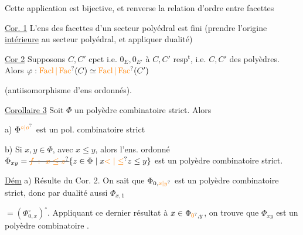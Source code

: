 Cette application est bijective, et renverse la relation d'ordre entre facettes

\uline{Cor. 1} L'ens des facettes d'un secteur polyédral est fini (prendre l'origine \uline{intérieure} au secteur polyédral, et appliquer dualité)

\uline{Cor 2} Supposons $C,C'$ cpct  i.e.  $0_E,0_{E'}$  à $C,C'$ resp$^{\mathrm t}$, i.e. $C,C'$ des polyèdres. Alors $\varphi:\unsure{\operatorname{Facl}|\operatorname{Fac}}(C)\simeq\unsure{\operatorname{Facl}|\operatorname{Fac}}(C')$


(antiisomorphisme d'ens ordonnés).

\uline{Corollaire 3} Soit $\Phi$ un polyèdre combinatoire strict. Alors

a) $\Phi^{\unsure{\circ|o}}$ est un pol. combinatoire strict

b) Si $x,y\in\Phi$, avec $x\leq y$, alors l'ens. ordonné $\Phi_{xy}=\deleted{\unsure{f\ \colon\ x\leq z}}\{z\in\Phi\mid x\unsure{<|\leq}z\leq y\}$ est un polyèdre combinatoire strict.

\uline{Dém} a) Résulte du Cor. 2. On sait que $\Phi_{0,\unsure{x|y}}$  est un polyèdre combinatoire strict, donc par dualité aussi $\Phi_{x,1}$  

$=(\Phi^{\circ}_{0,x})^\circ$. Appliquant ce dernier résultat à $x\in\Phi_{\unsure{0},y}$, on trouve que $\Phi_{xy}$ est un polyèdre combinatoire .




